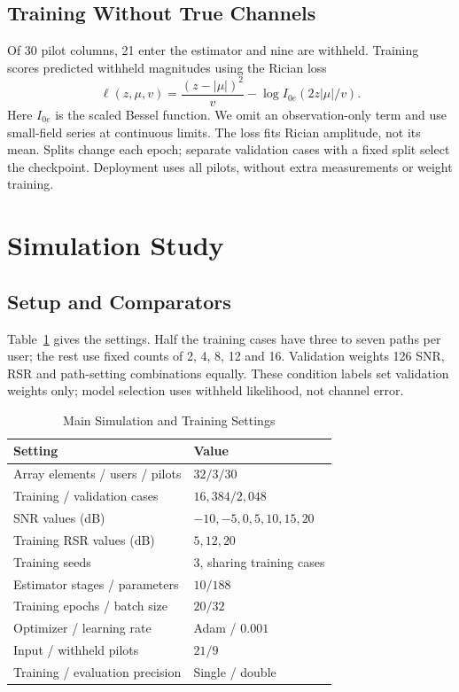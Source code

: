 \documentclass[journal]{IEEEtran}
\begin{document}
\subsection{Training Without True Channels}
Of 30 pilot columns, 21 enter the estimator and nine are withheld.
Training scores predicted withheld magnitudes using the Rician loss
\begin{equation}
 \ell(z,\mu,v)=\frac{(z-|\mu|)^2}{v}-\log I_{0e}(2z|\mu|/v).
\end{equation}
Here $I_{0e}$ is the scaled Bessel function. We omit an observation-only
term and use small-field series at continuous limits. The loss fits
Rician amplitude, not its mean. Splits change each epoch; separate
validation cases with a fixed split select the checkpoint. Deployment
uses all pilots, without extra measurements or weight training.

\section{Simulation Study}
\subsection{Setup and Comparators}
Table~\ref{tab:setup} gives the settings. Half the training cases have
three to seven paths per user; the rest use fixed counts of 2, 4, 8, 12
and 16. Validation weights 126 SNR, RSR and path-setting combinations
equally. These condition labels set validation weights only; model
selection uses withheld likelihood, not channel error.

\begin{table}[!t]
\caption{Main Simulation and Training Settings}\label{tab:setup}
\centering\small
\begin{tabular}{@{}ll@{}}\toprule
Setting & Value\\\midrule
Array elements / users / pilots & $32/3/30$\\
Training / validation cases & $16{,}384/2{,}048$\\
SNR values (dB) & $-10,-5,0,5,10,15,20$\\
Training RSR values (dB) & $5,12,20$\\
Training seeds & 3, sharing training cases\\
Estimator stages / parameters & $10/188$\\
Training epochs / batch size & $20/32$\\
Optimizer / learning rate & Adam / $0.001$\\
Input / withheld pilots & $21/9$\\
Training / evaluation precision & Single / double\\\bottomrule
\end{tabular}
\end{table}
\end{document}
